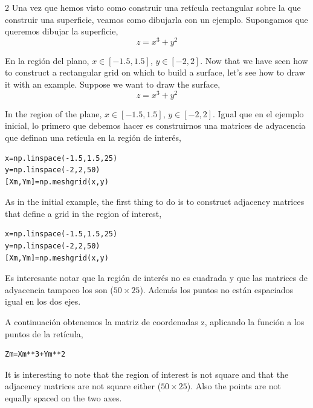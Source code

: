 \begin{paracol} {2}
Una vez que hemos visto como construir una retícula rectangular sobre la que construir una superficie, veamos como dibujarla con un ejemplo. Supongamos que queremos dibujar la superficie,
\begin{equation*}
z=x^3+y^2
\end{equation*}

En la región del plano, $x\in[-1.5,1.5]$, $y\in[-2,2]$. 
\switchcolumn
Now that we have seen how to construct a rectangular grid on which to build a surface, let's see how to draw it with an example. Suppose we want to draw the surface,
\begin{equation*}
z=x^3+y^2
\end{equation*}

In the region of the plane, $x\in[-1.5,1.5]$, $y\in[-2,2]$. 
\switchcolumn
Igual que en el ejemplo inicial, lo primero que debemos hacer es construirnos una matrices de adyacencia que definan una retícula en la región de interés,

\begin{verbatim}
x=np.linspace(-1.5,1.5,25)
y=np.linspace(-2,2,50)
[Xm,Ym]=np.meshgrid(x,y)
\end{verbatim}

\switchcolumn
As in the initial example, the first thing to do is to construct adjacency matrices that define a grid in the region of interest,

\begin{verbatim}
x=np.linspace(-1.5,1.5,25)
y=np.linspace(-2,2,50)
[Xm,Ym]=np.meshgrid(x,y)
\end{verbatim}

\switchcolumn

Es interesante notar que la región de interés no es cuadrada y que las matrices de adyacencia tampoco los son ($50\times 25$). Además los puntos no están espaciados igual en los dos ejes.

A continuación obtenemos la matriz de coordenadas z, aplicando la función a los puntos de la retícula,

\begin{verbatim}
Zm=Xm**3+Ym**2

\end{verbatim}

\switchcolumn
It is interesting to note that the region of interest is not square and that the adjacency matrices are not square either ($50\times 25$). Also the points are not equally spaced on the two axes.


\end{paracol}
